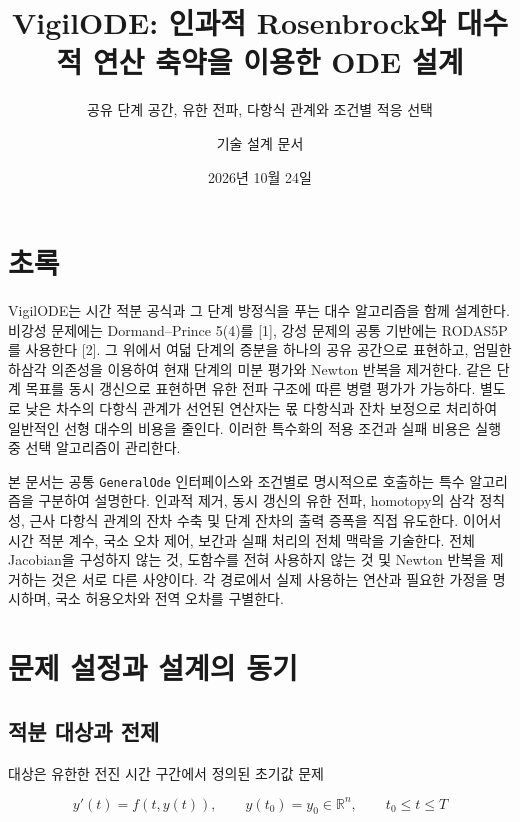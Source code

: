 \documentclass[
  10pt,
  dvipsnames]{article}
\title{VigilODE: 인과적 Rosenbrock와 대수적 연산 축약을 이용한 ODE 설계}
\subtitle{공유 단계 공간, 유한 전파, 다항식 관계와 조건별 적응 선택}
\author{기술 설계 문서}
\date{2026년 10월 24일}
\begin{document}
\maketitle

{
\hypersetup{linkcolor=}
\setcounter{tocdepth}{2}
\tableofcontents
}
\hypertarget{uxcd08uxb85d}{%
\section{초록}\label{uxcd08uxb85d}}

VigilODE는 시간 적분 공식과 그 단계 방정식을 푸는 대수 알고리즘을 함께
설계한다. 비강성 문제에는 Dormand--Prince 5(4)를 {[}1{]}, 강성 문제의
공통 기반에는 RODAS5P를 사용한다 {[}2{]}. 그 위에서 여덟 단계의 증분을
하나의 공유 공간으로 표현하고, 엄밀한 하삼각 의존성을 이용하여 현재
단계의 미분 평가와 Newton 반복을 제거한다. 같은 단계 목표를 동시
갱신으로 표현하면 유한 전파 구조에 따른 병렬 평가가 가능하다. 별도로
낮은 차수의 다항식 관계가 선언된 연산자는 몫 다항식과 잔차 보정으로
처리하여 일반적인 선형 대수의 비용을 줄인다. 이러한 특수화의 적용 조건과
실패 비용은 실행 중 선택 알고리즘이 관리한다.

본 문서는 공통 \texttt{GeneralOde} 인터페이스와 조건별로 명시적으로
호출하는 특수 알고리즘을 구분하여 설명한다. 인과적 제거, 동시 갱신의
유한 전파, homotopy의 삼각 정칙성, 근사 다항식 관계의 잔차 수축 및 단계
잔차의 출력 증폭을 직접 유도한다. 이어서 시간 적분 계수, 국소 오차 제어,
보간과 실패 처리의 전체 맥락을 기술한다. 전체 Jacobian을 구성하지 않는
것, 도함수를 전혀 사용하지 않는 것 및 Newton 반복을 제거하는 것은 서로
다른 사양이다. 각 경로에서 실제 사용하는 연산과 필요한 가정을 명시하며,
국소 허용오차와 전역 오차를 구별한다.

\hypertarget{uxbb38uxc81c-uxc124uxc815uxacfc-uxc124uxacc4uxc758-uxb3d9uxae30}{%
\section{문제 설정과 설계의
동기}\label{uxbb38uxc81c-uxc124uxc815uxacfc-uxc124uxacc4uxc758-uxb3d9uxae30}}

\hypertarget{uxc801uxbd84-uxb300uxc0c1uxacfc-uxc804uxc81c}{%
\subsection{적분 대상과
전제}\label{uxc801uxbd84-uxb300uxc0c1uxacfc-uxc804uxc81c}}

대상은 유한한 전진 시간 구간에서 정의된 초기값 문제

\[
 y'(t)=f(t,y(t)),\qquad y(t_0)=y_0\in\mathbb R^n,
 \qquad t_0\le t\le T
 \tag{1}
\]
\end{document}
